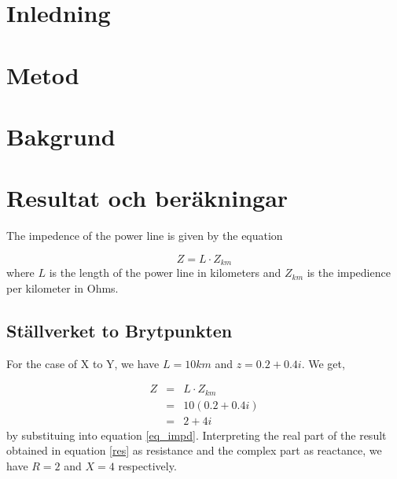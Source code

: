 \documentclass{report}
\title{}
\date{\today}
\author{Johanna Sörbom}
\newcommand{\case}[1]{\subsection*{#1}}
\newcommand{\cmp}[2]{\ensuremath{#1+#2i}}
\begin{document}
\maketitle
\section{Inledning}
\section{Metod}
\section{Bakgrund}
\section{Resultat och beräkningar}
The impedence of the power line is given by the equation 

\begin{equation}\label{eq_impd}
Z =  L \cdot Z_{km}
\end{equation} where $L$ is the length of the power line in kilometers and $Z_{km}$ is the impedience per kilometer in Ohms.

\case{Ställverket to Brytpunkten}
For the case of X to Y, we have $L=10km$ and $z=\cmp{0.2}{0.4}$.  We get,

\begin{eqnarray}
Z&=&  L \cdot Z_{km} \\
&=&10 (\cmp{0.2}{0.4}) \\
&=& \cmp{2}{4} \label{res}
\end{eqnarray} by substituing into equation \ref{eq_impd}. Interpreting the real part of the result obtained in equation \ref{res} as resistance and the complex part as reactance, we have $R=2$ and $X=4$ respectively.
\end{document}
